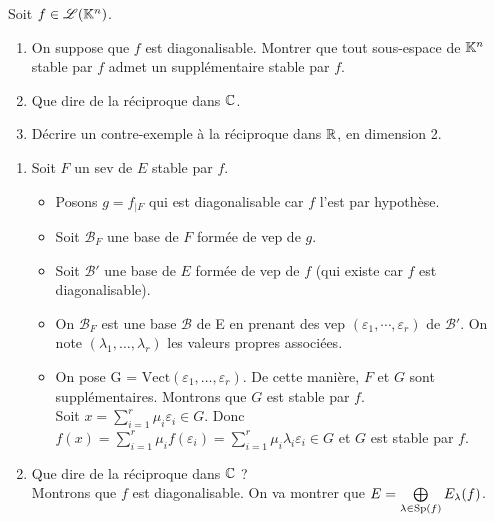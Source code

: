 \begin{exercice}
    Soit $f \in \mathscr{L}(\mathbb{K}^n)$.
    \begin{enumerate}
        \item On suppose que $f$ est diagonalisable. Montrer que tout sous-espace de $\mathbb{K}^n$ stable par $f$ admet un supplémentaire stable par $f$.
        \item Que dire de la réciproque dans $\mathbb{C}$.
        \item Décrire un contre-exemple à la réciproque dans $\mathbb{R}$, en dimension 2.
    \end{enumerate}
\end{exercice}  

\begin{enumerate}
    \item Soit $F$ un sev de $E$ stable par $f$.
    \begin{itemize}
        \item Posons $g = f_{\vert F}$ qui est diagonalisable car $f$ l'est par hypothèse. 
        \item Soit $\mathscr{B}_F$ une base de $F$ formée de vep de $g$. 
        \item Soit $\mathscr{B}'$ une base de $E$ formée de vep de $f$ (qui existe car $f$ est diagonalisable).
        \item On  $\mathscr{B}_F$ est une base $\mathscr{B}$ de E en prenant des vep $(\varepsilon_1, \cdots, \varepsilon_r)$ de $\mathscr{B}'$. On note $(\lambda_1, \dots, \lambda_r)$ les valeurs propres associées. 
        \item On pose G = $\mathrm{Vect}(\varepsilon_1, \dots, \varepsilon_r)$. De cette manière, $F$ et $G$ sont supplémentaires. Montrons que $G$ est stable par $f$. \\
        Soit $x = \sum\limits_{i=1}^{r} \mu_i \varepsilon_i \in G$. Donc $f(x) = \sum\limits_{i=1}^{r} \mu_i f(\varepsilon_i) =  \sum\limits_{i=1}^{r} \mu_i \lambda_i \varepsilon_i \in G$ et $G$ est stable par $f$.
    \end{itemize}
    
    \item Que dire de la réciproque dans $\mathbb{C}$ ? \\
    Montrons que $f$ est diagonalisable. On va montrer que $E = \bigoplus\limits_{\lambda \in \mathrm{Sp}(f)} E_\lambda (f)$.
    

\end{enumerate}
